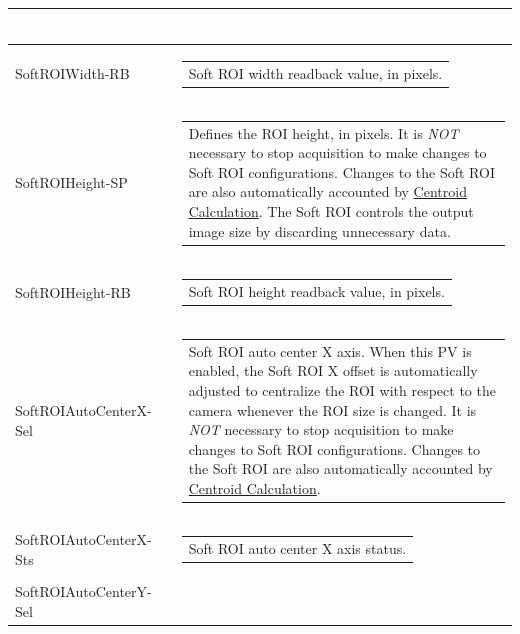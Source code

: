 \documentclass[openany]{article}
\begin{document}
\begin{longtable}{| m{3.0cm} m{4.5cm} m{7.0cm} |}
\begin{tabular}{@{}m{6cm}@{}}
            \end{tabular} \\ \hline
        SoftROIWidth-RB &  & \begin{tabular}{@{}m{6cm}@{}}
                Soft ROI width readback value, in pixels.
            \end{tabular} \hypertarget{pv:soft-roi-height}{}\\ \hline
        SoftROIHeight-SP &  & \begin{tabular}{@{}m{6cm}@{}}
                Defines the ROI height, in pixels. It is \emph{NOT} necessary to stop
                acquisition to make changes to Soft ROI configurations. Changes to the
                Soft ROI are also automatically accounted by 
                \hyperref[sec:centroid-calc]{Centroid Calculation}.
                The Soft ROI controls the output image size by discarding unnecessary data.
            \end{tabular} \\ \hline
        SoftROIHeight-RB &  & \begin{tabular}{@{}m{6cm}@{}}
                Soft ROI height readback value, in pixels.
            \end{tabular} \hypertarget{pv:soft-roi-auto-center-x}{}\\ \hline
        SoftROIAutoCenterX-Sel &  & \begin{tabular}{@{}m{6cm}@{}}
                Soft ROI auto center X axis. When this PV is enabled, the Soft ROI X offset 
                is automatically adjusted to centralize the ROI with respect to the camera
                whenever the ROI size is changed. It is \emph{NOT} necessary to stop
                acquisition to make changes to Soft ROI configurations. Changes to the
                Soft ROI are also automatically accounted by 
                \hyperref[sec:centroid-calc]{Centroid Calculation}.
            \end{tabular} \\ \hline
        SoftROIAutoCenterX-Sts &  & \begin{tabular}{@{}m{6cm}@{}}
                Soft ROI auto center X axis status.
            \end{tabular} \hypertarget{pv:soft-roi-auto-center-y}{}\\ \hline
        SoftROIAutoCenterY-Sel &  & \begin{tabular}{@{}m{6cm}@{}}

\end{tabular}
\end{longtable}
\end{document}
